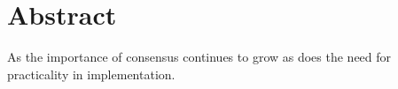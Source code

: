 \section*{Abstract}

As the importance of consensus continues to grow as does the need for practicality in implementation.